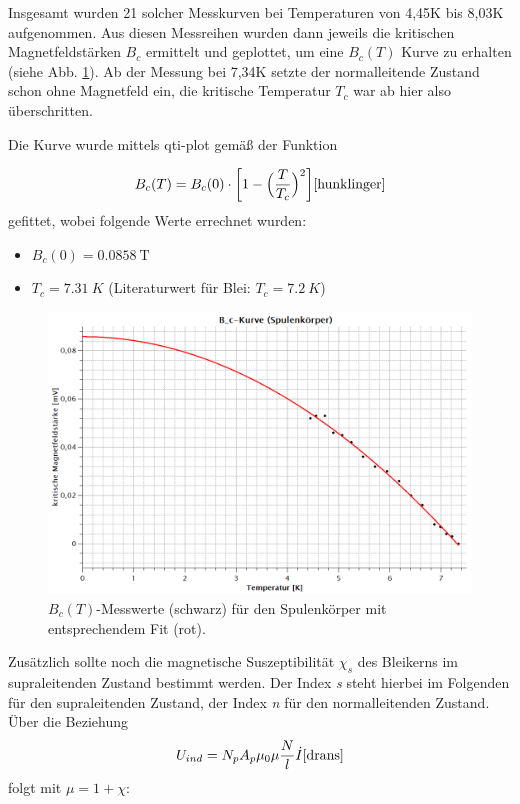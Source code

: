 Insgesamt wurden 21 solcher Messkurven bei Temperaturen von 4,45K bis 8,03K aufgenommen. Aus diesen Messreihen wurden dann jeweils die kritischen Magnetfeldstärken $B_{c}$ ermittelt und geplottet, um eine $B_{c} (T)$ Kurve zu erhalten (siehe Abb. \ref{B_c_Spule}). Ab der Messung bei 7,34K setzte der normalleitende Zustand schon ohne Magnetfeld ein, die kritische Temperatur $T_{c}$ war ab hier also überschritten.

Die Kurve wurde mittels qti-plot gemäß der Funktion 

\[B_{c}(T)=B_{c}(0)\cdot\bigg[1-\Big(\dfrac{T}{T_{c}}\Big)^2\bigg] \cite{hunklinger} \] 
gefittet, wobei folgende Werte errechnet wurden:
\begin{itemize}
	\item $B_{c}(0)=\SI{0,0858}{\tesla}$
	\item $T_{c}=\SI{7,31}{K}$ (Literaturwert für Blei: $T_{c}=\SI{7,2}{K}$)
\end{itemize}



\begin{figure}[H]
	\begin{center}
		\includegraphics[width=15cm]{B_c_Spule.png}
		\caption{$B_{c}(T)$-Messwerte (schwarz) für den Spulenkörper mit  entsprechendem Fit (rot).}
		\label{B_c_Spule}
	\end{center}
\end{figure}

Zusätzlich sollte noch die magnetische Suszeptibilität $\chi_{s}$ des Bleikerns im supraleitenden Zustand bestimmt werden. Der Index \textit{s} steht hierbei im Folgenden für den supraleitenden Zustand, der Index \textit{n} für den normalleitenden Zustand.
Über die Beziehung 
\[U_{ind}=N_{p}A_{p}\mu_{0}\mu \dfrac{N}{l}\dot{I} \cite{drans}\] 
folgt mit $\mu=1+\chi$:

